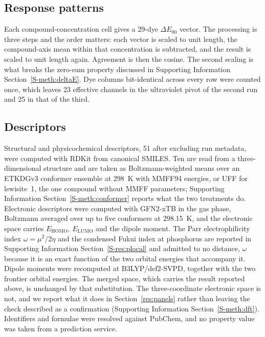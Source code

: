 \documentclass[journal=jacsat,manuscript=article,margin=1in]{achemso}
\begin{document}
\subsection{Response patterns}
\label{meth:patterns}
Each compound-concentration cell gives a 29-dye $\Delta E_{00}$ vector.
The processing is three steps and the order matters: each vector is scaled to
unit length, the compound-axis mean within that concentration is subtracted,
and the result is scaled to unit length again. Agreement is then the cosine.
The second scaling is what breaks the zero-sum property discussed in
Supporting Information Section~\ref{S-meth:deltaE}. Dye columns bit-identical
across every row were counted once, which leaves 23 effective channels in the
ultraviolet pivot of the second run and 25 in that of the third.

\subsection{Descriptors}
\label{meth:descriptors}
Structural and physicochemical descriptors, 51 after excluding run metadata,
were computed with RDKit from canonical SMILES. Ten are read from a
three-dimensional structure and are taken as Boltzmann-weighted means over an
ETKDGv3 conformer ensemble at 298~K with MMFF94 energies, or UFF for
lewisite~1, the one compound without MMFF parameters; Supporting Information
Section~\ref{S-meth:conformer} reports what the two treatments do. Electronic
descriptors were computed with GFN2-xTB in the gas phase, Boltzmann averaged
over up to five conformers at 298.15~K, and the electronic space carries
$E_\mathrm{HOMO}$, $E_\mathrm{LUMO}$ and the dipole moment. The Parr
electrophilicity index $\omega = \mu^{2}/2\eta$ and the condensed Fukui index
at phosphorus are reported in Supporting Information
Section~\ref{S-res:plocal} and admitted to no distance, $\omega$ because it
is an exact function of the two orbital energies that accompany it. Dipole moments were
recomputed at B3LYP/def2-SVPD, together with the two frontier orbital
energies. The merged space, which carries the result reported above, is
unchanged by that substitution. The three-coordinate electronic space is
not, and we report what it does in Section~\ref{res:panels} rather than
leaving the check described as a confirmation (Supporting Information
Section~\ref{S-meth:dft}). Identifiers and formulae were resolved
against PubChem, and no property value was taken from a prediction service.
\end{document}
